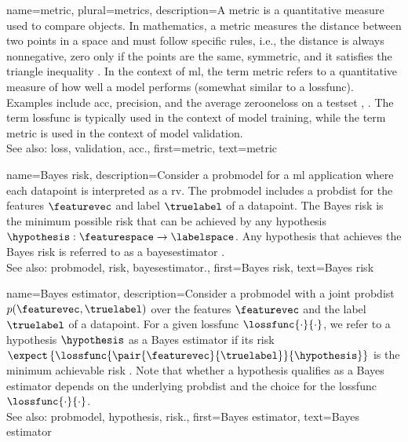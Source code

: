 {name={metric}, plural={metrics},
	description={A metric is a quantitative measure used to compare objects. 
	     In mathematics, a metric measures the distance 
		 between two points in a space and must follow specific rules, i.e., the distance is always 
		 nonnegative, zero only if the points are the same, symmetric, and it satisfies the 
		triangle inequality \cite{RudinBookPrinciplesMatheAnalysis}. In the context of 
		\gls{ml}, the term metric refers to a quantitative measure of how well a \gls{model} performs (somewhat 
		similar to a \gls{lossfunc}). Examples include \gls{acc}, precision, and the average 
		\gls{zerooneloss} on a \gls{testset} \cite{Goodfellow-et-al-2016}, \cite{BishopBook}. 
		The term \gls{lossfunc} is typically used in the context of \gls{model} \gls{training}, 
		while the term metric is used in the context of \gls{model} \gls{validation}.
		\\ 
		See also: \gls{loss}, \gls{validation}, \gls{acc}.},
	first={metric}, 
	text={metric}
}

{name={Bayes risk},
	description={Consider a \gls{probmodel} for a \gls{ml} application where each 
	\gls{datapoint} is interpreted as a \gls{rv}. The \gls{probmodel} includes 
	a \gls{probdist} for the \glspl{feature} $\featurevec$ and \gls{label} $\truelabel$ 
	of a \gls{datapoint}. The Bayes \gls{risk} is the \gls{minimum} 
	possible \gls{risk} that can be achieved by any \gls{hypothesis} $\hypothesis: \featurespace \rightarrow \labelspace$. 
		Any \gls{hypothesis} that achieves the Bayes \gls{risk} is referred to as a 
		\gls{bayesestimator} \cite{LC}.
		\\
		See also: \gls{probmodel}, \gls{risk}, \gls{bayesestimator}.},
	first={Bayes risk},
	text={Bayes risk}
}
	
{name={Bayes estimator},
	description={Consider a \gls{probmodel} with a joint \gls{probdist} 
		$p(\featurevec,\truelabel)$ over the \glspl{feature} $\featurevec$ and the \gls{label} $\truelabel$ 
		of a \gls{datapoint}. For a given \gls{lossfunc} $\lossfunc{\cdot}{\cdot}$, we refer to a \gls{hypothesis} 
		$\hypothesis$ as a Bayes estimator if its \gls{risk} 
		$\expect\left\{\lossfunc{\pair{\featurevec}{\truelabel}}{\hypothesis}\right\}$
		is the \gls{minimum} achievable \gls{risk} \cite{LC}. 
		Note that whether a \gls{hypothesis} qualifies as a Bayes estimator depends on 
		the underlying \gls{probdist} and the choice for the \gls{lossfunc} $\lossfunc{\cdot}{\cdot}$.
		\\
		See also: \gls{probmodel}, \gls{hypothesis}, \gls{risk}.},
	first={Bayes estimator},
	text={Bayes estimator}
}



